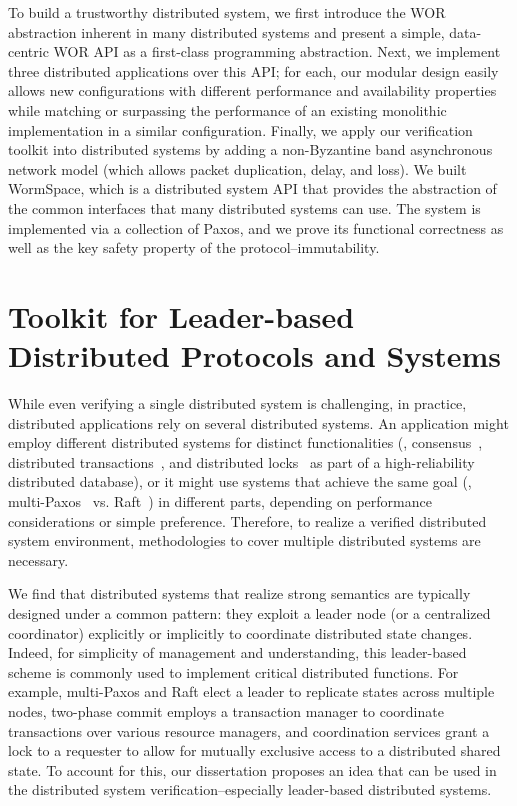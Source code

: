 To build a trustworthy distributed system, we first introduce the WOR abstraction inherent in many distributed systems and present a simple, 
data-centric WOR API as a first-class programming abstraction.  
Next, we implement three distributed applications over this API; for each, our modular design easily allows new configurations 
with different performance and availability properties while matching or surpassing the performance of an existing monolithic implementation 
in a similar configuration. Finally, we apply our verification toolkit into distributed systems by adding a 
non-Byzantine band asynchronous network model (which allows packet duplication, delay, and loss). We built WormSpace, 
which is a distributed system API that provides the abstraction of the common interfaces that many distributed systems can use. 
The system is implemented via a collection of Paxos, and we prove its functional correctness as well as the key safety property of the 
protocol--immutability.


\section{Toolkit for Leader-based Distributed Protocols and Systems}
\label{chapter:introduction:sec:toolkit-for-leader-based-distributed-protocols-and-systems}


While even verifying a single distributed system is challenging, in practice, distributed applications 
rely on several distributed systems. An application might employ different distributed systems for distinct functionalities (\eg,
consensus~\cite{vivaladifference}, distributed transactions~\cite{gray:2006},
and distributed locks~\cite{chubby, zookeeper} as part of a high-reliability distributed database),
or it might use systems that achieve the same goal 
 (\eg,
multi-Paxos~\cite{paxosmadesimple, rvrpaxos} vs. Raft~\cite{raft}) in different parts, depending on performance considerations or simple preference.
 Therefore, to realize a verified distributed system environment, methodologies to cover multiple distributed systems are necessary.

We find that distributed systems that realize strong semantics are typically designed under a common pattern: 
they exploit a leader node (or a centralized coordinator) explicitly or implicitly to coordinate distributed state changes. Indeed, 
for simplicity of management and understanding, this leader-based scheme is commonly used to implement critical distributed functions. 
For example, multi-Paxos and Raft elect a leader to replicate states across multiple nodes, two-phase commit employs a transaction manager to
 coordinate transactions over various resource managers, and coordination services grant a lock to a requester to allow for mutually exclusive 
 access to a distributed shared state. 
 To account for this, our dissertation proposes an idea that can be used in the distributed system 
 verification--especially leader-based distributed systems.

